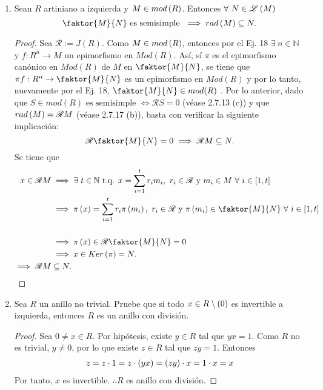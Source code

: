 \documentclass{article}
\begin{document}
\begin{enumerate}[label=\textbf{Ej \arabic*.}]
		\item Sean $R$ artiniano a izquierda y $M\in mod\left(R\right)$. Entonces
		$\forall\ N\in\genlin{M}$ 
		\begin{equation*}
			\faktor{M}{N}\text{ es semisimple }\implies rad\lrprth{M}\subseteq N.
		\end{equation*}
		\begin{proof}
			Sea $\mathscr{R}:=J(R)$. Como $M\in mod\left(R\right)$, entonces por el Ej. 18 $\exists\ n\in\mathbb{N}$ y $f:R^n\to M$ un epimorfismo en  $Mod(R)$. Así, sí $\pi$ es el epimorfismo canónico en $Mod(R)$ de $M$ en $\faktor{M}{N}$, se tiene que $\pi f:R^n\to \faktor{M}{N}$ es un epimorfismo en $Mod(R)$ y por lo tanto, nuevamente por el Ej. 18, $\faktor{M}{N}\in mod(R)$ . Por lo anterior, dado que $S\in mod(R)\text{ es semisimple }\iff \mathscr{R}S=0$ (véase 2.7.13 (c)) y que $rad\left(M\right)=\mathscr{R}M$ (véase 2.7.17 (b)), basta con verificar la siguiente implicación:
			\begin{equation*}
				\mathscr{R}\faktor{M}{N}=0\implies \mathscr{R} M\subseteq N.
			\end{equation*}
			Se tiene que
			\begin{align*}
				x\in\mathscr{R}M&\implies \exists\ t\in\mathbb{N}\text{ t.q. } x=\sum\limits_{i=1}^{t}r_im_i,\ r_i\in\mathscr{R}\text{ y } m_i\in M\ \forall\ i\in[1,t]\\
				&\implies \pi\lrprth{x}=\sum\limits_{i=1}^{t}r_i\pi\lrprth{m_i},\ r_i\in\mathscr{R}\text{ y } \pi\lrprth{m_i}\in \faktor{M}{N}\ \forall\ i\in[1,t]\\\\
				&\implies \pi\lrprth{x}\in\mathscr{R}\faktor{M}{N}=0\\
				&\implies x\in Ker\lrprth{\pi}=N.\\
				\implies \mathscr{R} M&\subseteq N.
			\end{align*}
		\end{proof}
		
\item Sea $R$ un anillo no trivial. Pruebe que si todo $x \in R\setminus\left(0\right)$ es invertible a izquierda, entonces $R$ es un anillo con división.
	\begin{proof}
		Sea $0 \neq x \in R$. Por hipótesis, existe $y \in R$ tal que $yx=1$. Como $R$ no es trivial, $y \neq 0$, por lo que existe $z \in R$ tal que $zy=1$. Entonces
		\begin{align*}
			z=z \cdot 1=z \cdot \left(yx\right)=\left(zy\right) \cdot x=1 \cdot x=x
		\end{align*}
		Por tanto, $x$ es invertible. $\therefore R$ es anillo con división.
	\end{proof}


\end{enumerate}
\end{document}
